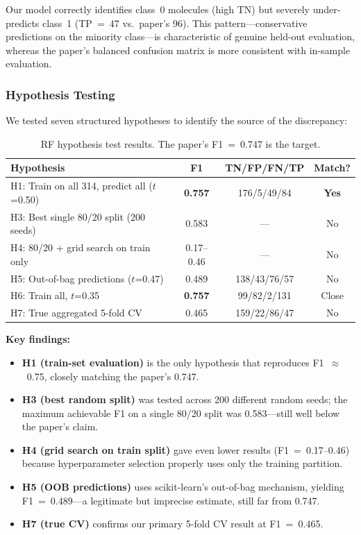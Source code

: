 \documentclass[11pt,a4paper]{article}
\begin{document}
Our model correctly identifies class~0 molecules (high TN) but severely under-predicts class~1 (TP~=~47 vs.\ paper's 96). This pattern---conservative predictions on the minority class---is characteristic of genuine held-out evaluation, whereas the paper's balanced confusion matrix is more consistent with in-sample evaluation.

\subsubsection{Hypothesis Testing}
\label{sec:rf_hypotheses}

We tested seven structured hypotheses to identify the source of the discrepancy:

\begin{table}[H]
\centering
\caption{RF hypothesis test results. The paper's F1~=~0.747 is the target.}
\label{tab:rf_hyp}
\begin{tabular}{L{7.2cm}ccc}
\toprule
Hypothesis & F1 & TN/FP/FN/TP & Match? \\
\midrule
H1: Train on all 314, predict all ($t$=0.50) & \textbf{0.757} & 176/5/49/84 & \textcolor{matchgreen}{\textbf{Yes}} \\
H3: Best single 80/20 split (200 seeds) & 0.583 & --- & \textcolor{gapred}{No} \\
H4: 80/20 + grid search on train only & 0.17--0.46 & --- & \textcolor{gapred}{No} \\
H5: Out-of-bag predictions ($t$=0.47) & 0.489 & 138/43/76/57 & \textcolor{gapred}{No} \\
H6: Train all, $t$=0.35 & \textbf{0.757} & 99/82/2/131 & \textcolor{matchgreen}{Close} \\
H7: True aggregated 5-fold CV & 0.465 & 159/22/86/47 & \textcolor{gapred}{No} \\
\bottomrule
\end{tabular}
\end{table}

\textbf{Key findings:}
\begin{itemize}[nosep]
    \item \textbf{H1 (train-set evaluation)} is the only hypothesis that reproduces F1~$\approx$~0.75, closely matching the paper's 0.747.
    \item \textbf{H3 (best random split)} was tested across 200 different random seeds; the maximum achievable F1 on a single 80/20 split was 0.583---still well below the paper's claim.
    \item \textbf{H4 (grid search on train split)} gave even lower results (F1~=~0.17--0.46) because hyperparameter selection properly uses only the training partition.
    \item \textbf{H5 (OOB predictions)} uses scikit-learn's out-of-bag mechanism, yielding F1~=~0.489---a legitimate but imprecise estimate, still far from 0.747.
    \item \textbf{H7 (true CV)} confirms our primary 5-fold CV result at F1~=~0.465.
\end{itemize}
\end{document}
